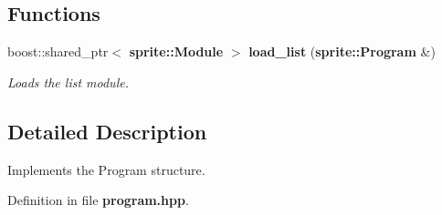\subsection*{Functions}
\begin{CompactItemize}
\item 
boost::shared\_\-ptr$<$ {\bf sprite::Module} $>$ {\bf load\_\-list} ({\bf sprite::Program} \&)\label{program_8hpp_a0}

\begin{CompactList}\small\item\em Loads the list module. \item\end{CompactList}\end{CompactItemize}


\subsection{Detailed Description}
Implements the Program structure. 



Definition in file {\bf program.hpp}.